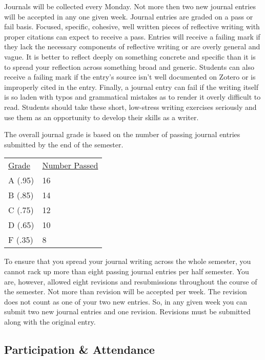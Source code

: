 \documentclass[]{tufte-handout}
\begin{document}
Journals will be collected every Monday. Not more then two new journal entries will be accepted in any one given week. Journal entries are graded on a pass or fail basis. Focused, specific, cohesive, well written pieces of reflective writing with proper citations can expect to receive a pass. Entries will receive a failing mark if they lack the necessary components of reflective writing or are overly general and vague. It is better to reflect deeply on something concrete and specific than it is to spread your reflection across something broad and generic. Students can also receive a failing mark if the entry's source isn't well documented on Zotero or is improperly cited in the entry. Finally, a journal entry can fail if the writing itself is so laden with typos and grammatical mistakes as to render it overly difficult to read.  Students should take these short, low-stress writing exercises seriously and use them as an opportunity to develop their skills as a writer. 

The overall journal grade is based on the number of passing journal entries submitted by the end of the semester. 

\begin{center}
\begin{tabular}{ll}
\underline{Grade} & \underline{Number Passed} \\
A (.95) & 16 \\
B (.85) & 14 \\
C (.75) & 12 \\
D (.65) & 10\\
F (.35) & 8 \\
\end{tabular}
\end{center}

To ensure that you spread your journal writing across the whole semester, you cannot rack up more than eight passing journal entries per half semester. You are, however, allowed eight revisions and resubmissions throughout the course of the semester. Not more than revision will be accepted per week. The revision does not count as one of your two new entries. So, in any given week you can submit two new journal entries and one revision. Revisions must be submitted along with the original entry. 


\subsection{Participation \& Attendance}
\end{document}
